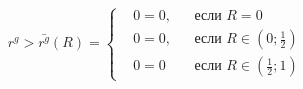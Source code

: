	\begin{equation}
	r^g> \bar{r^g}(R) = \left\{ 
	\begin{aligned} 
	&0=0, &&\text{если } R=0
	\\
	&0=0, &&\text{если } 	R\in(0; \frac{1}{2})
	\\
	&0=0&&\text{если } 	R\in( \frac{1}{2};1)
	\end{aligned}
	\right.		
	\end{equation}